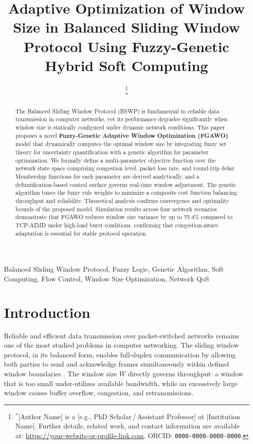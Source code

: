 \documentclass[10pt, twocolumn]{IEEEtran}
\title{Adaptive Optimization of Window Size in Balanced Sliding Window Protocol Using Fuzzy-Genetic Hybrid Soft Computing}
\author{
  \IEEEauthorblockN{[Author Name]$^{*}$}
  \IEEEauthorblockA{Department of Computer Science \& Engineering\\
  [Institution Name], [City, Country]\\
  \texttt{[email@domain.com]}
  }
  \thanks{$^{*}$[Author Name] is a [e.g., PhD Scholar\,/\,Assistant Professor] at [Institution Name].
  Further details, related work, and contact information are available at:
  \url{https://your-website-or-profile-link.com}.
  ORCID: \texttt{0000-0000-0000-0000}.}
}
\theoremstyle{definition}
\begin{document}
\maketitle

\begin{abstract}
The Balanced Sliding Window Protocol (BSWP) is fundamental to reliable data transmission in computer networks, yet its performance degrades significantly when window size is statically configured under dynamic network conditions. This paper proposes a novel \textbf{Fuzzy-Genetic Adaptive Window Optimization (FGAWO)} model that dynamically computes the optimal window size by integrating fuzzy set theory for uncertainty quantification with a genetic algorithm for parameter optimization. We formally define a multi-parameter objective function over the network state space comprising congestion level, packet loss rate, and round-trip delay. Membership functions for each parameter are derived analytically, and a defuzzification-based control surface governs real-time window adjustment. The genetic algorithm tunes the fuzzy rule weights to minimize a composite cost function balancing throughput and reliability. Theoretical analysis confirms convergence and optimality bounds of the proposed model. Simulation results across four network scenarios demonstrate that FGAWO reduces window size variance by up to 75.4\% compared to TCP-AIMD under high-load burst conditions, confirming that congestion-aware adaptation is essential for stable protocol operation.
\end{abstract}

\begin{IEEEkeywords}
Balanced Sliding Window Protocol, Fuzzy Logic, Genetic Algorithm, Soft Computing, Flow Control, Window Size Optimization, Network QoS
\end{IEEEkeywords}

\section{Introduction}

Reliable and efficient data transmission over packet-switched networks remains one of the most studied problems in computer networking. The sliding window protocol, in its balanced form, enables full-duplex communication by allowing both parties to send and acknowledge frames simultaneously within defined window boundaries \cite{tanenbaum2011computer}. The window size $W$ directly governs throughput: a window that is too small under-utilizes available bandwidth, while an excessively large window causes buffer overflow, congestion, and retransmissions.
\end{document}
